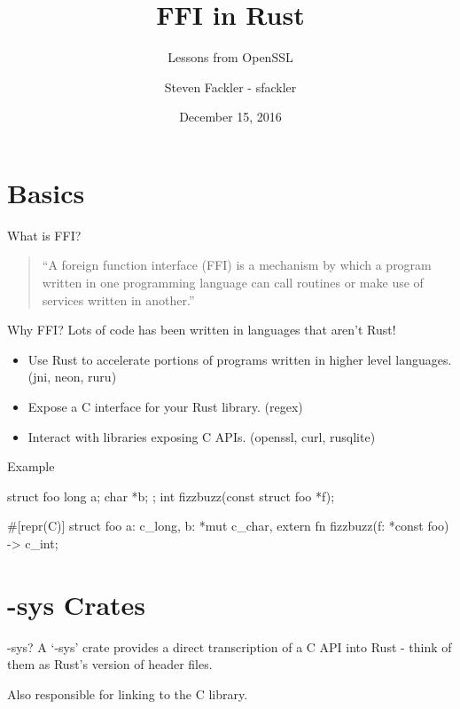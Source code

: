 \documentclass{beamer}
\title{FFI in Rust}
\subtitle{Lessons from OpenSSL}
\author[sfackler]{Steven Fackler - sfackler}
\date{December 15, 2016}
\begin{document}

\frame{\titlepage}

\frame{\tableofcontents}

\section{Basics}

\begin{frame}{What is FFI?}
    \begin{quote}
        ``A foreign function interface (FFI) is a mechanism by which a program
        written in one programming language can call routines or make use of
        services written in another.''
    \end{quote}
\end{frame}

\begin{frame}{Why FFI?}
    Lots of code has been written in languages that aren't Rust!

    \begin{itemize}
        \item Use Rust to accelerate portions of programs written in higher
            level languages. (jni, neon, ruru)
        \item Expose a C interface for your Rust library. (regex)
        \item Interact with libraries exposing C APIs. (openssl, curl,
            rusqlite)
    \end{itemize}
\end{frame}

\begin{frame}[fragile]{Example}
    \begin{ccode}
struct foo {
    long a;
    char *b;
};
int fizzbuzz(const struct foo *f);
    \end{ccode}
    \vspace{10pt}
    \begin{rustcode}
#[repr(C)]
struct foo {
    a: c_long,
    b: *mut c_char,
}
extern {
    fn fizzbuzz(f: *const foo) -> c_int;
}
    \end{rustcode}
\end{frame}

\section{-sys Crates}

\begin{frame}{-sys?}
    A `-sys' crate provides a direct transcription of a C API into Rust - think
    of them as Rust's version of header files.

    Also responsible for linking to the C library.
\end{frame}
\end{document}
